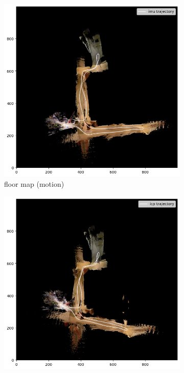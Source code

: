\documentclass[conference]{IEEEtran}
\begin{document}
\begin{figure}
    \begin{subfigure}{0.24\textwidth}
        \includegraphics[width=\linewidth]{../img/fmap_20_imu.png}
        \caption{floor map (motion)}
        \label{fig:fmap_20_imu}
    \end{subfigure}
    \hfill
    \begin{subfigure}{0.24\textwidth}
        \includegraphics[width=\linewidth]{../img/fmap_20_icp.png}

\end{subfigure}
\end{figure}
\end{document}
